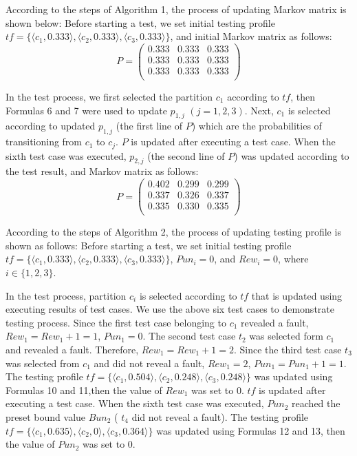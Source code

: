 \documentclass[10pt,journal,compsoc]{IEEEtran}
\begin{document}
According to the steps of Algorithm 1, the process of updating Markov matrix is shown below: Before starting a test, we set initial testing profile $tf = \{\langle c_1,0.333 \rangle, \langle c_2, 0.333\rangle, \langle c_3, 0.333 \rangle\}$, and initial Markov matrix as follows:
\begin{equation}
\label{eq:Inimatrix}
P =
\begin{pmatrix}
	0.333 & 0.333  & 0.333  \\
	0.333 & 0.333  & 0.333  \\
	0.333 & 0.333  & 0.333  \\
\end{pmatrix}
\end{equation}

In the test process, we first selected the partition $c_1$ according to $tf$, then Formulas 6 and 7 were used to update $p_{1,j}$ $(j = 1,2,3)$. Next, $c_1$ is selected according to updated $p_{1,j}$ (the first line of $P$) which are the probabilities of transitioning from $c_1$ to $c_j$. $P$ is updated after executing a test case. When the sixth test case was executed, $p_{2,j}$ (the second line of $P$) was updated according to the test result, and Markov matrix as follows:
\begin{equation}
\label{eq:sixthmatrix}
P =
\begin{pmatrix}
	0.402 & 0.299  & 0.299  \\
	0.337 & 0.326  & 0.337  \\
	0.335 & 0.330  & 0.335  \\
\end{pmatrix}
\end{equation}

According to the steps of Algorithm 2, the process of updating testing profile is shown as follows: Before starting a test, we set initial testing profile $tf = \{\langle c_1, 0.333 \rangle,\langle c_2, 0.333 \rangle, \langle c_3, 0.333 \rangle\}$, $Pun_i = 0$, and $Rew_i = 0$, where $i \in \{1, 2, 3\}$.

In the test process, partition $c_i$ is selected according to $tf$ that is updated using executing results of test cases. We use the above six test cases to demonstrate testing process. Since the first test case belonging to $c_1$ revealed a fault, $Rew_1 = Rew_1 + 1 = 1$, $Pun_1 = 0$. The second test case $t_2$ was selected form $c_1$ and revealed a fault. Therefore, $Rew_1 = Rew_1 + 1 = 2$. Since the third test case $t_3$ was selected from $c_1$ and did not reveal a fault, $Rew_1 = 2$, $Pun_1 = Pun_1 + 1 = 1$. The testing profile $tf = \{\langle c_1, 0.504 \rangle,\langle c_2, 0.248 \rangle, \langle c_3, 0.248 \rangle\}$ was updated using Formulas 10 and 11,then the value of $Rew_1$ was set to 0. $tf$ is updated after executing a test case. When the sixth test case was executed, $Pun_2$ reached the preset bound value $Bun_2$ ( $t_4$ did not reveal a fault). The testing profile $tf = \{\langle c_1, 0.635 \rangle,\langle c_2, 0 \rangle, \langle c_3, 0.364 \rangle\}$ was updated using Formulas 12 and 13, then the value of $Pun_2$ was set to 0.
\end{document}
